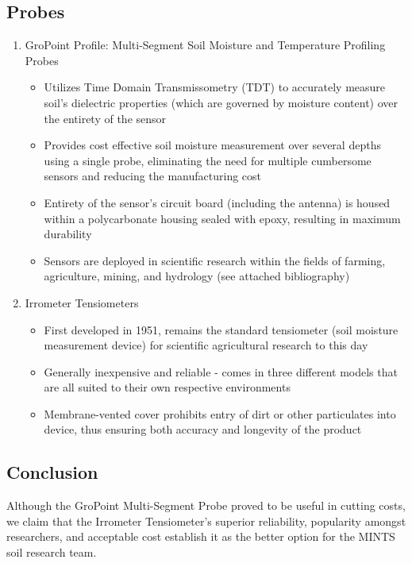 \documentclass{article}
\begin{document}
\subsection{Probes}
\begin{enumerate}
\item GroPoint Profile: Multi-Segment Soil Moisture and Temperature Profiling Probes
\begin{itemize}
    \item Utilizes Time Domain Transmissometry (TDT) to accurately measure soil's dielectric properties (which are governed by moisture content) over the entirety of the sensor 
    \item Provides cost effective soil moisture measurement over several depths using a single probe, eliminating the need for multiple cumbersome sensors and reducing the manufacturing cost
    \item Entirety of the sensor's circuit board (including the antenna) is housed within a polycarbonate housing sealed with epoxy, resulting in maximum durability
    \item Sensors are deployed in scientific research within the fields of farming, agriculture, mining, and hydrology (see attached bibliography)
\end{itemize}

\item Irrometer Tensiometers
\begin{itemize}
    \item First developed in 1951, remains the standard tensiometer (soil moisture measurement device) for scientific agricultural research to this day
    \item Generally inexpensive and reliable - comes in three different models that are all suited to their own respective environments
    \item Membrane-vented cover prohibits entry of dirt or other particulates into device, thus ensuring both accuracy and longevity of the product
\end{itemize}

\end{enumerate}

\subsection{Conclusion}
Although the GroPoint Multi-Segment Probe proved to be useful in cutting costs, we claim that the Irrometer Tensiometer's superior reliability, popularity amongst researchers, and acceptable cost establish it as the better option for the MINTS soil research team.
\end{document}
